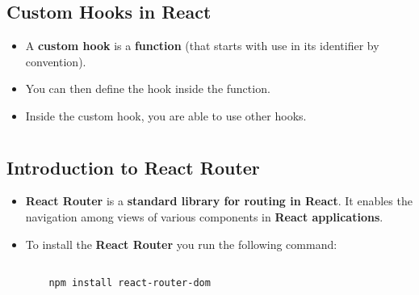 \documentclass{article}
\begin{document}
    \section*{}

    \subsection*{Custom Hooks in React}
    \begin{itemize}
        \item A \textbf{custom hook} is a \textbf{function} (that starts with use in its identifier by convention).
        \item You can then define the hook inside the function.
        \item Inside the custom hook, you are able to use other hooks.
    \end{itemize}

    \section*{}

    \subsection*{Introduction to React Router}
    \begin{itemize}
        \item \textbf{React Router} is a \textbf{standard library for routing in React}. It enables the navigation among views of various components in \textbf{React applications}.
        \item To install the \textbf{React Router} you run the following command:
        \begin{lstlisting}[language=bash]

    npm install react-router-dom
        \end{lstlisting}
    \end{itemize}
\end{document}
